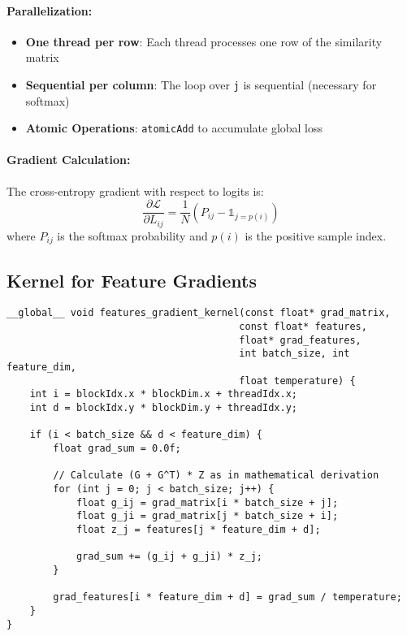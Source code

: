 \documentclass[a4paper,11pt]{article}
\begin{document}
\paragraph{Parallelization:}
\begin{itemize}
    \item \textbf{One thread per row}: Each thread processes one row of the similarity matrix
    \item \textbf{Sequential per column}: The loop over \texttt{j} is sequential (necessary for softmax)
    \item \textbf{Atomic Operations}: \texttt{atomicAdd} to accumulate global loss
\end{itemize}

\paragraph{Gradient Calculation:}
The cross-entropy gradient with respect to logits is:
\begin{equation}
\frac{\partial \mathcal{L}}{\partial L_{ij}} = \frac{1}{N}(P_{ij} - \mathbb{1}_{j=p(i)})
\end{equation}
where $P_{ij}$ is the softmax probability and $p(i)$ is the positive sample index.

\subsection{Kernel for Feature Gradients}

\begin{lstlisting}[caption={Kernel for feature gradient calculation}]
__global__ void features_gradient_kernel(const float* grad_matrix, 
                                        const float* features,
                                        float* grad_features, 
                                        int batch_size, int feature_dim,
                                        float temperature) {
    int i = blockIdx.x * blockDim.x + threadIdx.x;
    int d = blockIdx.y * blockDim.y + threadIdx.y;
    
    if (i < batch_size && d < feature_dim) {
        float grad_sum = 0.0f;
        
        // Calculate (G + G^T) * Z as in mathematical derivation
        for (int j = 0; j < batch_size; j++) {
            float g_ij = grad_matrix[i * batch_size + j];
            float g_ji = grad_matrix[j * batch_size + i];
            float z_j = features[j * feature_dim + d];
            
            grad_sum += (g_ij + g_ji) * z_j;
        }
        
        grad_features[i * feature_dim + d] = grad_sum / temperature;
    }
}
\end{lstlisting}
\end{document}
